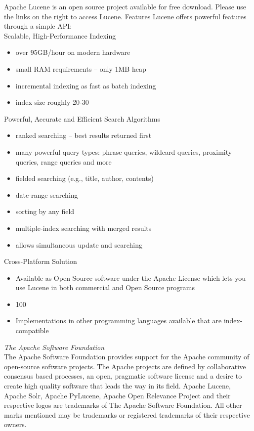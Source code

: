 Apache Lucene is an open source project available for free download. Please use the links on the right to access Lucene.
Features
Lucene offers powerful features through a simple API:\\
Scalable, High-Performance Indexing
\begin{itemize}
   \item over 95GB/hour on modern hardware
   \item small RAM requirements -- only 1MB heap
  \item  incremental indexing as fast as batch indexing
    \item index size roughly 20-30%
\end{itemize}
Powerful, Accurate and Efficient Search Algorithms
\begin{itemize}
 \item   ranked searching -- best results returned first
  \item  many powerful query types: phrase queries, wildcard queries, proximity queries, range queries and more
  \item  fielded searching (e.g., title, author, contents)
 \item   date-range searching
   \item sorting by any field
  \item  multiple-index searching with merged results
  \item  allows simultaneous update and searching
\end{itemize}
Cross-Platform Solution
\begin{itemize}
  \item  Available as Open Source software under the Apache License which lets you use Lucene in both commercial and Open Source programs
 \item   100%
  \item  Implementations in other programming languages available that are index-compatible
\end{itemize}
\textit{The Apache Software Foundation}\\

The Apache Software Foundation provides support for the Apache community of open-source software projects. The Apache projects are defined by collaborative consensus based processes, an open, pragmatic software license and a desire to create high quality software that leads the way in its field. Apache Lucene, Apache Solr, Apache PyLucene, Apache Open Relevance Project and their respective logos are trademarks of The Apache Software Foundation. All other marks mentioned may be trademarks or registered trademarks of their respective owners.\\
